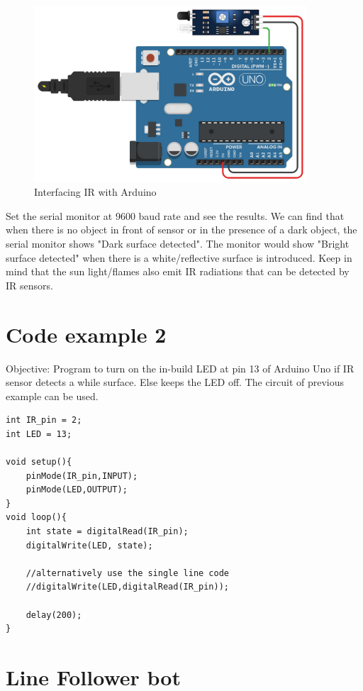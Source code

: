 \begin{figure}	
	\centering
	\includegraphics[width=4in]{Images/IR Sensor/circuit1.png}
	\caption{Interfacing \ac{IR} with Arduino}
\end{figure}

\par Set the serial monitor at 9600 baud rate and see the results. We can find that when there is no object in front of sensor or in the presence of a dark object, the serial monitor shows "Dark surface detected". The monitor would show "Bright surface detected" when there is a white/reflective surface is introduced. Keep in mind that the sun light/flames also emit \ac{IR} radiations that can be detected by \ac{IR} sensors.

\section{\textbf{Code example 2}}
Objective: Program to turn on the in-build LED at pin 13 of Arduino Uno if \ac{IR} sensor detects a while surface. Else keeps the LED off. The circuit of previous example can be used.

\begin{lstlisting}[style=CStyle]
int IR_pin = 2;
int LED = 13;

void setup(){
    pinMode(IR_pin,INPUT);
    pinMode(LED,OUTPUT);
}
void loop(){
    int state = digitalRead(IR_pin);
    digitalWrite(LED, state);
    
    //alternatively use the single line code
    //digitalWrite(LED,digitalRead(IR_pin));
    
    delay(200);
}
\end{lstlisting}


\section{Line Follower bot}

